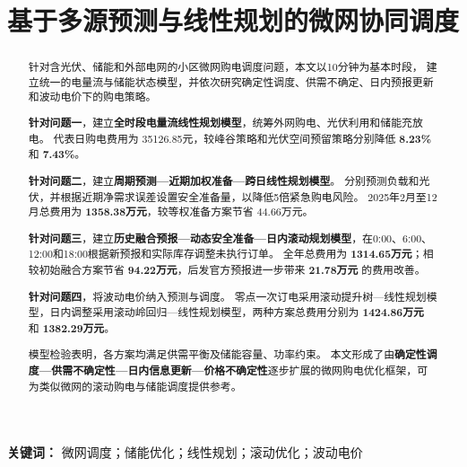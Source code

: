 \title{\textbf{基于多源预测与线性规划的微网协同调度}}
\date{}
\maketitle
\begin{abstract}
针对含光伏、储能和外部电网的小区微网购电调度问题，本文以10分钟为基本时段，
建立统一的电量流与储能状态模型，并依次研究确定性调度、供需不确定、日内预报更新和波动电价下的购电策略。

\textbf{针对问题一}，建立\textbf{全时段电量流线性规划模型}，统筹外网购电、光伏利用和储能充放电。
代表日购电费用为 35126.85元，较峰谷策略和光伏空间预留策略分别降低 \textbf{8.23\%} 和 \textbf{7.43\%}。

\textbf{针对问题二}，建立\textbf{周期预测—近期加权准备—跨日线性规划模型}。
分别预测负载和光伏，并根据近期净需求误差设置安全准备量，以降低5倍紧急购电风险。
2025年2月至12月总费用为 \textbf{1358.38万元}，较等权准备方案节省 44.66万元。

\textbf{针对问题三}，建立\textbf{历史融合预报—动态安全准备—日内滚动规划模型}，在0:00、6:00、12:00和18:00根据新预报和实际库存调整未执行订单。
全年总费用为 \textbf{1314.65万元}；相较初始融合方案节省 \textbf{94.22万元}，后发官方预报进一步带来 \textbf{21.78万元} 的费用改善。

\textbf{针对问题四}，将波动电价纳入预测与调度。
零点一次订电采用滚动提升树—线性规划模型，日内调整采用滚动岭回归—线性规划模型，两种方案总费用分别为 \textbf{1424.86万元} 和 \textbf{1382.29万元}。

模型检验表明，各方案均满足供需平衡及储能容量、功率约束。
本文形成了由\textbf{确定性调度—供需不确定性—日内信息更新—价格不确定性}逐步扩展的微网购电优化框架，可为类似微网的滚动购电与储能调度提供参考。
\end{abstract}
\textbf{关键词：} 微网调度；储能优化；线性规划；滚动优化；波动电价

\newpage